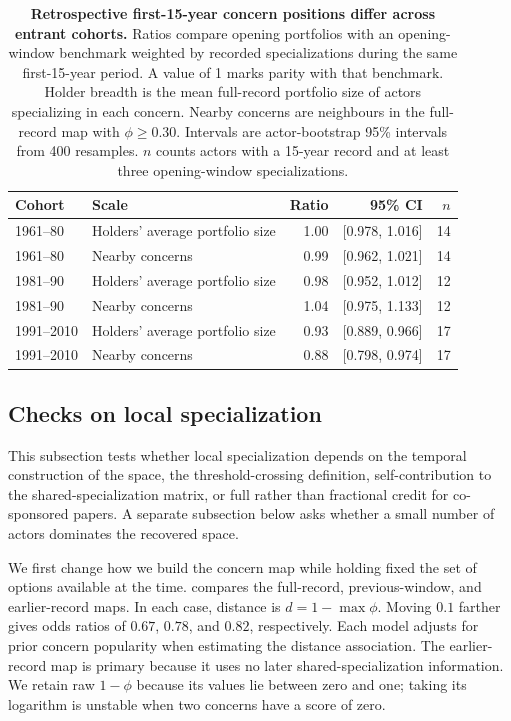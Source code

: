 \documentclass{fun_article}
\begin{document}
\begin{table}[!htbp]
\centering
\scriptsize
\caption{\textbf{Retrospective first-15-year concern positions differ across entrant cohorts.} Ratios compare opening portfolios with an opening-window benchmark weighted by recorded specializations during the same first-15-year period. A value of 1 marks parity with that benchmark. Holder breadth is the mean full-record portfolio size of actors specializing in each concern. Nearby concerns are neighbours in the full-record map with $\phi\ge0.30$. Intervals are actor-bootstrap 95\% intervals from 400 resamples. $n$ counts actors with a 15-year record and at least three opening-window specializations.}
\label{tab:cohort-ratios}
\begin{tabular}{@{}llrrr@{}}
\hline
\textbf{Cohort} & \textbf{Scale} & \textbf{Ratio} & \textbf{95\% CI} & \textbf{$n$} \\
\hline
1961--80 & Holders' average portfolio size & 1.00 & [0.978, 1.016] & 14 \\
1961--80 & Nearby concerns & 0.99 & [0.962, 1.021] & 14 \\
1981--90 & Holders' average portfolio size & 0.98 & [0.952, 1.012] & 12 \\
1981--90 & Nearby concerns & 1.04 & [0.975, 1.133] & 12 \\
1991--2010 & Holders' average portfolio size & 0.93 & [0.889, 0.966] & 17 \\
1991--2010 & Nearby concerns & 0.88 & [0.798, 0.974] & 17 \\
\hline
\end{tabular}
\end{table}

\subsection{Checks on local specialization}\label{sec:substantive-sensitivity}
This subsection tests whether local specialization depends on the temporal construction of the space, the threshold-crossing definition, self-contribution to the shared-specialization matrix, or full rather than fractional credit for co-sponsored papers. A separate subsection below asks whether a small number of actors dominates the recovered space.

We first change how we build the concern map while holding fixed the set of options available at the time.  compares the full-record, previous-window, and earlier-record maps. In each case, distance is $d=1-\max\phi$. Moving $0.1$ farther gives odds ratios of $0.67$, $0.78$, and $0.82$, respectively. Each model adjusts for prior concern popularity when estimating the distance association. The earlier-record map is primary because it uses no later shared-specialization information. We retain raw $1-\phi$ because its values lie between zero and one; taking its logarithm is unstable when two concerns have a score of zero.
\end{document}
